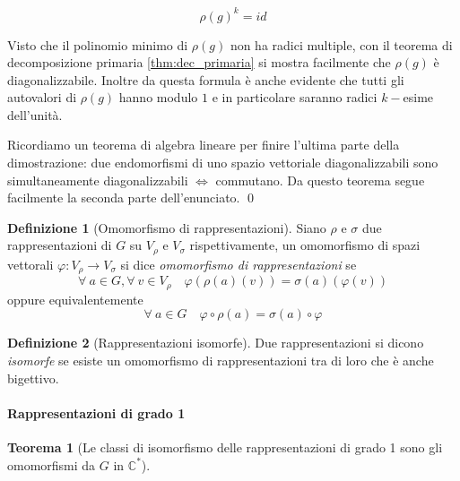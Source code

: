 \documentclass[11pt]{article}
\theoremstyle{plain}
\newtheorem{thm}{Teorema}[section]
\theoremstyle{definition}
\newtheorem{defn}{Definizione}[section]
\theoremstyle{remark}
\newcommand{\C}{\mathbb{C}}
\begin{document}
\[ \rho(g)^k = id\]

Visto che il polinomio minimo di $\rho(g)$ non ha radici multiple, con il teorema di decomposizione primaria \eqref{thm:dec_primaria} si mostra facilmente che $\rho(g)$ è diagonalizzabile. Inoltre da questa formula è anche evidente che tutti gli autovalori di $\rho(g)$ hanno modulo $1$ e in particolare saranno radici $k-$esime dell'unità.

Ricordiamo un teorema di algebra lineare per finire l'ultima parte della dimostrazione: due endomorfismi di uno spazio vettoriale diagonalizzabili sono simultaneamente diagonalizzabili $\Leftrightarrow$ commutano. Da questo teorema segue facilmente la seconda parte dell'enunciato. \qed





\begin{defn}[Omomorfismo di rappresentazioni]
Siano $\rho$ e $\sigma$ due rappresentazioni di $G$ su $V_{\rho}$ e $V_{\sigma}$ rispettivamente, un omomorfismo di spazi vettorali $\varphi:V_{\rho}\to V_{\sigma}$ si dice \textit{omomorfismo di rappresentazioni} se
\[
	\forall\ a\in G, \forall\ v\in V_{\rho}\quad \varphi(\rho(a)(v)) = \sigma(a)(\varphi(v))
\]
oppure equivalentemente
\[
	\forall\ a\in G\quad \varphi\circ \rho(a) = \sigma(a)\circ \varphi
\]






\end{defn}



\begin{defn}[Rappresentazioni isomorfe]
Due rappresentazioni si dicono \textit{isomorfe} se esiste un omomorfismo di rappresentazioni tra di loro che è anche bigettivo.
\end{defn}




\paragraph{Rappresentazioni di grado 1}

\begin{thm}[Le classi di isomorfismo delle rappresentazioni di grado 1 sono gli omomorfismi da $G$ in $\C^*$]


\end{thm}
\end{document}
